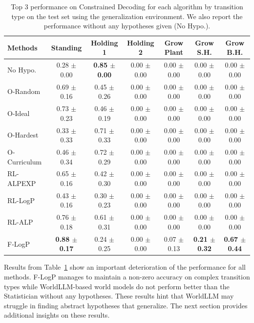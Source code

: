 \documentclass{article}
\begin{document}
\begin{table}
\centering
{\tiny
\begin{tabular}{lcccccc}
\toprule
\textbf{Methods} & \textbf{Standing} & \textbf{Holding 1} & \textbf{Holding 2} & \textbf{Grow Plant} & \textbf{Grow S.H.} & \textbf{Grow B.H.} \\
\midrule
No Hypo. & 0.28 $\pm$ 0.00 & \textbf{0.85 $\pm$ 0.00} & 0.00 $\pm$ 0.00 & 0.00 $\pm$ 0.00 & 0.00 $\pm$ 0.00 & 0.00 $\pm$ 0.00 \\
\midrule
O-Random & 0.69 $\pm$ 0.16 & 0.45 $\pm$ 0.26 & 0.00 $\pm$ 0.00 & 0.00 $\pm$ 0.00 & 0.00 $\pm$ 0.00 & 0.00 $\pm$ 0.00 \\
O-Ideal & 0.73 $\pm$ 0.23 & 0.46 $\pm$ 0.19 & 0.00 $\pm$ 0.00 & 0.00 $\pm$ 0.00 & 0.00 $\pm$ 0.00 & 0.00 $\pm$ 0.00 \\
O-Hardest & 0.33 $\pm$ 0.33 & 0.71 $\pm$ 0.33 & 0.00 $\pm$ 0.00 & 0.00 $\pm$ 0.00 & 0.00 $\pm$ 0.00 & 0.00 $\pm$ 0.00 \\
O-Curriculum & 0.46 $\pm$ 0.34 & 0.72 $\pm$ 0.29 & 0.00 $\pm$ 0.00 & 0.00 $\pm$ 0.00 & 0.00 $\pm$ 0.00 & 0.00 $\pm$ 0.00 \\
\midrule
RL-ALPEXP & 0.65 $\pm$ 0.16 & 0.42 $\pm$ 0.30 & 0.00 $\pm$ 0.00 & 0.00 $\pm$ 0.00 & 0.00 $\pm$ 0.00 & 0.00 $\pm$ 0.00 \\
\midrule
RL-LogP & 0.43 $\pm$ 0.16 & 0.30 $\pm$ 0.23 & 0.00 $\pm$ 0.00 & 0.00 $\pm$ 0.00 & 0.00 $\pm$ 0.00 & 0.00 $\pm$ 0.00 \\
RL-ALP & 0.76 $\pm$ 0.18 & 0.61 $\pm$ 0.31 & 0.00 $\pm$ 0.00 & 0.00 $\pm$ 0.00 & 0.00 $\pm$ 0.00 & 0.00 $\pm$ 0.00 \\
\midrule
F-LogP & \textbf{0.88 $\pm$ 0.17} & 0.24 $\pm$ 0.25 & 0.00 $\pm$ 0.00 & 0.07 $\pm$ 0.13 & \textbf{0.21 $\pm$ 0.32} & \textbf{0.67 $\pm$ 0.44} \\
\bottomrule
\end{tabular}}
\caption{Top 3 performance on Constrained Decoding for each algorithm by transition type on the test set using the generalization environment. We also report the performance without any hypotheses given (No Hypo.).}
\label{tab:4-worldllm-constrained-decoding-finetuning-generalization}
\end{table}

Results from Table~\ref{tab:4-worldllm-constrained-decoding-finetuning-generalization} show an important deterioration of the performance for all methods. F-LogP manages to maintain a non-zero accuracy on complex transition types while WorldLLM-based world models do not perform better than the Statistician without any hypotheses. These results hint that WorldLLM may struggle in finding abstract hypotheses that generalize. The next section provides additional insights on these results.
\end{document}
